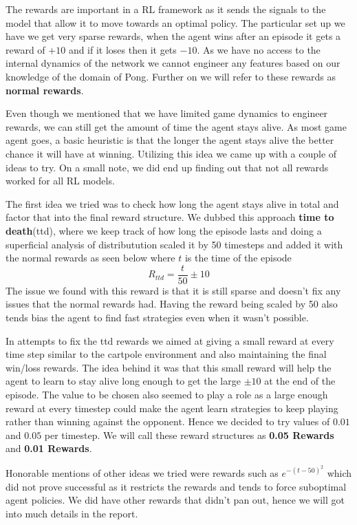 The rewards are important in a RL framework as it sends the signals to the model that allow it to move towards an optimal policy. The particular set up we have we get very sparse rewards, when the agent wins after an episode it gets a reward of $+10$ and if it loses then it gets $-10$. As we have no access to the internal dynamics of the network we cannot engineer any features based on our knowledge of the domain of Pong. Further on we will refer to these rewards as \textbf{normal rewards}. 

\medskip
\noindent
Even though we mentioned that we have limited game dynamics to engineer rewards, we can still get the amount of time the agent stays alive. As most game agent goes, a basic heuristic is that the longer the agent stays alive the better chance it will have at winning. Utilizing this idea we came up with a couple of ideas to try. On a small note, we did end up finding out that not all rewards worked for all RL models.

\medskip
\noindent
The first idea we tried was to check how long the agent stays alive in total and factor that into the final reward structure. We dubbed this approach \textbf{time to death}(ttd), where we keep track of how long the episode lasts and doing a superficial analysis of distributution scaled it by 50 timesteps and added it with the normal rewards as seen below where $t$ is the time of the episode
\[
    R_{ttd} = \frac{t}{50} \pm 10 
\]
The issue we found with this reward is that it is still sparse and doesn't fix any issues that the normal rewards had. Having the reward being scaled by 50 also tends bias the agent to find fast strategies even when it wasn't possible.

\medskip
\noindent
In attempts to fix the ttd rewards we aimed at giving a small reward at every time step similar to the cartpole environment and also maintaining the final win/loss rewards. The idea behind it was that this small reward will help the agent to learn to stay alive long enough to get the large $\pm 10$ at the end of the episode. The value to be chosen also seemed to play a role as a large enough reward at every timestep could make the agent learn strategies to keep playing rather than winning against the opponent. Hence we decided to try values of $0.01$ and $0.05$ per timestep. We will call these reward structures as \textbf{0.05 Rewards} and \textbf{0.01 Rewards}. 

\medskip
\noindent
Honorable mentions of other ideas we tried were rewards such as $e^{-(t-50)^{2}}$ which did not prove successful as it restricts the rewards and tends to force suboptimal agent policies. We did have other rewards that didn't pan out, hence we will got into much details in the report.